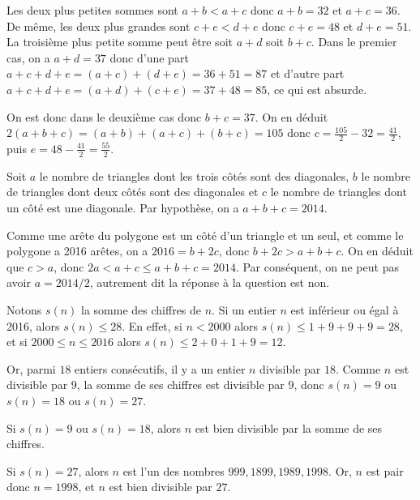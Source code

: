 \begin{sol}
Les deux plus petites sommes sont $a+b<a+c$ donc $a+b=32$ et $a+c=36$. De m\^eme, les deux plus grandes sont $c+e<d+e$ donc $c+e=48$ et $d+e=51$. La troisi\`eme plus petite somme peut \^etre soit $a+d$ soit $b+c$. Dans le premier cas, on a $a+d=37$ donc d'une part $a+c+d+e=(a+c)+(d+e)=36+51=87$ et d'autre part $a+c+d+e=(a+d)+(c+e)=37+48=85$, ce qui est absurde.

On est donc dans le deuxi\`eme cas donc $b+c=37$. On en d\'eduit $2(a+b+c)=(a+b)+(a+c)+(b+c)=105$ donc $c=\frac{105}{2}-32=\frac{41}{2}$, puis $e=48-\frac{41}{2}=\frac{55}{2}$.
\end{sol}

\begin{sol}
 Soit $a$ le nombre de triangles dont les trois c\^ot\'es sont des diagonales, $b$ le nombre de triangles
dont deux c\^ot\'es sont des diagonales et $c$ le nombre de triangles dont un c\^ot\'e est une diagonale.
Par hypoth\`ese, on a $a+b+c=2014$.

Comme une ar\^ete du polygone est un c\^ot\'e d'un triangle et un seul, et comme le polygone a 2016 ar\^etes,
on a $2016=b+2c$, donc $b+2c>a+b+c$. On en d\'eduit que $c>a$, donc $2a<a+c\leqslant a+b+c=2014$.
Par cons\'equent, on ne peut pas avoir $a=2014/2$, autrement dit la r\'eponse \`a la question est non. 
\end{sol}

\begin{sol}
Notons $s(n)$ la somme des chiffres de $n$.
 Si un entier $n$ est inf\'erieur ou \'egal \`a 2016, alors $s(n)\leqslant 28$. En effet, si $n<2000$ alors $s(n)\leqslant 1+9+9+9=28$, et si $2000\leqslant n\leqslant 2016$ alors
$s(n)\leqslant 2+0+1+9=12$.

Or, parmi $18$ entiers cons\'ecutifs, il y a un entier $n$ divisible par $18$.
Comme $n$ est divisible par $9$, la somme de ses chiffres est divisible par $9$, donc
$s(n)=9$ ou $s(n)=18$ ou $s(n)=27$.

Si $s(n)=9$ ou $s(n)=18$, alors $n$ est bien divisible par la somme de ses chiffres.

Si $s(n)=27$, alors $n$ est l'un des nombres $999,1899,1989,1998$. Or, $n$ est
pair donc $n=1998$, et $n$ est bien divisible par $27$.
\end{sol}

